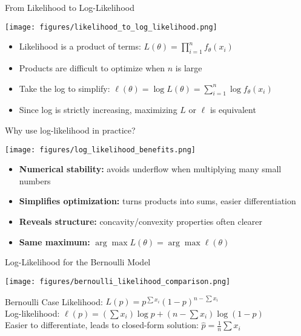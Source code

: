 \begin{frame}{From Likelihood to Log-Likelihood}
  \footnotesize
  \begin{center}
    \texttt{[image: figures/likelihood\_to\_log\_likelihood.png]}
  \end{center}
  \vspace{-0.7em}
  \begin{itemize}
    \item Likelihood is a product of terms: \(L(\theta) = \prod_{i=1}^n f_\theta(x_i)\)
    \item Products are difficult to optimize when \(n\) is large
    \item Take the log to simplify: \(\ell(\theta) = \log L(\theta) = \sum_{i=1}^n \log f_\theta(x_i)\)
    \item Since log is strictly increasing, maximizing \(L\) or \(\ell\) is equivalent
  \end{itemize}
\end{frame}

\begin{frame}{Why use log-likelihood in practice?}
  \footnotesize
  \begin{center}
    \texttt{[image: figures/log\_likelihood\_benefits.png]}
  \end{center}
  \vspace{-0.7em}
  \begin{itemize}
    \item \textbf{Numerical stability:} avoids underflow when multiplying many small numbers
    \item \textbf{Simplifies optimization:} turns products into sums, easier differentiation
    \item \textbf{Reveals structure:} concavity/convexity properties often clearer
    \item \textbf{Same maximum:} \(\arg\max L(\theta) = \arg\max \ell(\theta)\)
  \end{itemize}
\end{frame}

\begin{frame}{Log-Likelihood for the Bernoulli Model}
  \footnotesize
  \begin{center}
    \texttt{[image: figures/bernoulli\_likelihood\_comparison.png]}
  \end{center}
  \vspace{-0.7em}
  \begin{block}{Bernoulli Case}
    \small
    Likelihood: \(L(p) = p^{\sum x_i}(1-p)^{n-\sum x_i}\)\\
    Log-likelihood: \(\ell(p) = (\sum x_i) \log p + (n - \sum x_i) \log(1-p)\)\\
    Easier to differentiate, leads to closed-form solution: \(\hat{p} = \tfrac{1}{n}\sum x_i\)
  \end{block}
\end{frame}


